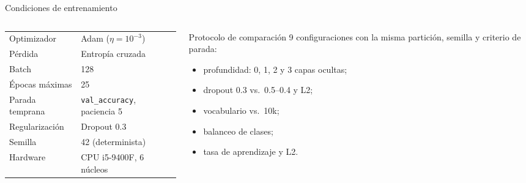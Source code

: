 \documentclass[10pt,aspectratio=169]{beamer}
\begin{document}
\begin{frame}{Condiciones de entrenamiento}
  \begin{columns}[T]
    \begin{column}{0.53\textwidth}
      \begin{table}
        \centering
        \small
        \begin{tabular}{ll}
          \toprule
          Optimizador & Adam ($\eta=10^{-3}$) \\
          Pérdida & Entropía cruzada \\
          Batch & 128 \\
          Épocas máximas & 25 \\
          Parada temprana & \texttt{val\_accuracy}, paciencia 5 \\
          Regularización & Dropout 0.3 \\
          Semilla & 42 (determinista) \\
          Hardware & CPU i5-9400F, 6 núcleos \\
          \bottomrule
        \end{tabular}
      \end{table}
    \end{column}
    \begin{column}{0.44\textwidth}
      \begin{block}{Protocolo de comparación}
        \small
        9 configuraciones con la misma partición, semilla y criterio de parada:
        \begin{itemize}
          \item profundidad: 0, 1, 2 y 3 capas ocultas;
          \item dropout 0.3 vs.\ 0.5--0.4 y L2;
          \item vocabulario \Vocab{} vs.\ 10k;
          \item balanceo de clases;
          \item tasa de aprendizaje y L2.
        \end{itemize}
      \end{block}
    \end{column}
  \end{columns}
\end{frame}
\end{document}
